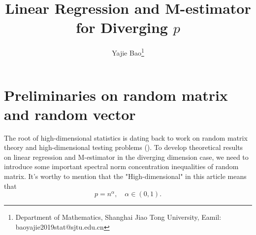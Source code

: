 \documentclass[12pt]{article}
\numberwithin{equation}{section}
\begin{document}
\title{Linear Regression and M-estimator for Diverging $p$}

\author{Yajie Bao\thanks{Department of Mathematics, Shanghai Jiao Tong University, Eamil: baoyajie2019stat@sjtu.edu.cn}}
\maketitle
\section{Preliminaries on random matrix and random vector}
The root of high-dimensional statistics is dating back to work on random matrix theory and high-dimensional testing problems (\citet{negahban2012unified}). To develop theoretical results on linear regression and M-estimator in the diverging dimension case, we need to introduce some important spectral norm concentration inequalities of random matrix. It's worthy to mention that the "High-dimensional" in this article means that
$$
p=n^{\alpha},\quad \alpha\in (0,1).
$$
\end{document}
